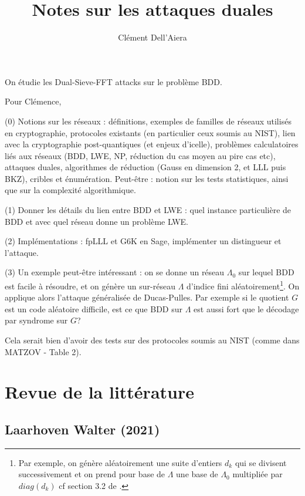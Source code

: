 \documentclass{article}
\title{Notes sur les attaques duales}
\author{Clément Dell'Aiera}
\begin{document}
\maketitle

On étudie les Dual-Sieve-FFT attacks sur le problème BDD.

Pour Clémence,

(0) Notions sur les réseaux : définitions, exemples de familles de réseaux utilisés en cryptographie, protocoles existants (en particulier ceux soumis au NIST), lien avec la cryptographie post-quantiques (et enjeux d'icelle), problèmes calculatoires liés aux réseaux (BDD,  LWE, NP, réduction du cas moyen au pire cas etc), attaques duales, algorithmes de réduction (Gauss en dimension 2, et LLL puis BKZ), cribles et énumération. Peut-être : notion sur les tests statistiques, ainsi que sur la complexité algorithmique.  

(1) Donner les détails du lien entre BDD et LWE : quel instance particulière de BDD et avec quel réseau donne un problème LWE.

(2) Implémentations : fpLLL et G6K en Sage, implémenter un distingueur et l'attaque.

(3) Un exemple peut-être intéressant : on se donne un réseau $\Lambda_0$ sur lequel BDD est facile à résoudre, et on génère un sur-réseau $\Lambda$ d'indice fini aléatoirement\footnote{Par exemple, on génère aléatoirement une suite d'entiers $d_k$ qui se divisent successivement et on prend pour base de $\Lambda$ une base de $\Lambda_0$ multipliée par $diag(d_k)$ cf section 3.2 de \cite{DucasPulles}.}. On applique alors l'attaque généralisée de Ducas-Pulles. Par exemple si le quotient $G$ est un code aléatoire difficile, est ce que BDD sur $\Lambda$ est aussi fort que le décodage par syndrome sur $G$?

Cela serait bien d'avoir des tests sur des protocoles soumis au NIST (comme dans MATZOV - Table 2).

\section{Revue de la littérature}

\subsection{Laarhoven Walter (2021)}%
\end{document}
